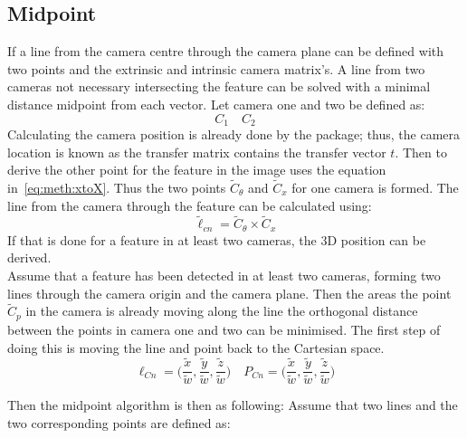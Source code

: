 



\subsection{Midpoint}%
\label{sub:Midpoint}
If a line from the camera centre through the camera plane can be defined with two points and the extrinsic and intrinsic camera matrix's.
A line from two cameras not necessary intersecting the feature can be solved with a minimal distance midpoint from each vector.
Let camera one and two be defined as:
\begin{equation}
    C_1 \quad C_2
\end{equation}
Calculating the camera position is already done by the \aruco package; thus, the camera location is known as the transfer matrix contains the transfer vector $t$.
Then to derive the other point for the feature in the image uses the equation in~\ref{eq:meth:xtoX}.
Thus the two points $\tilde{C}_\theta$ and $\tilde{C}_x$ for one camera is formed.
The line from the camera through the feature can be calculated using:
\begin{equation}
    \tilde{\ell}_{cn} = \tilde{C}_\theta \times \tilde{C}_x
\end{equation}
If that is done for a feature in at least two cameras, the 3D position can be derived.\\
Assume that a feature has been detected in at least two cameras, forming two lines through the camera origin and the camera plane.
Then the areas the point $\tilde{C}_p$ in the camera is already moving along the line the orthogonal distance between the points in camera one and two can be minimised.
The first step of doing this is moving the line and point back to the Cartesian space.
\begin{equation}
    \ell_{Cn} = \big( \frac{\tilde x}{\tilde w}, \frac{\tilde y}{\tilde w}, \frac{\tilde z}{\tilde w} \big)
    \quad
    P_{Cn} = \big( \frac{\tilde x}{\tilde w}, \frac{\tilde y}{\tilde w}, \frac{\tilde z}{\tilde w} \big)
\end{equation}

Then the midpoint algorithm is then as following:
Assume that two lines and the two corresponding points are defined as:

